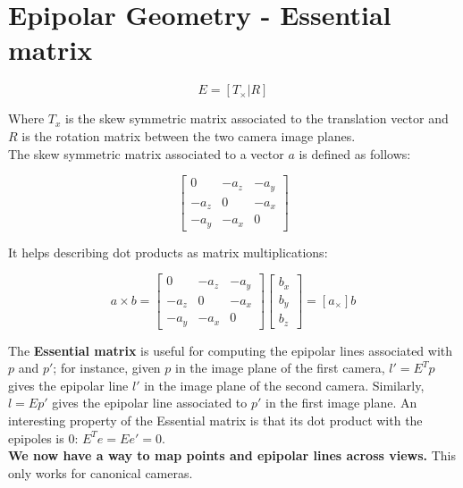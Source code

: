 \documentclass{article}
\begin{document}
\section*{Epipolar Geometry - Essential matrix}

\begin{equation*}
    E = [T_{\times} | R]
\end{equation*}

Where $T_x$ is the skew symmetric matrix associated to the translation vector and $R$ is the rotation matrix between the two camera image planes. \\

The skew symmetric matrix associated to a vector $a$ is defined as follows:

\begin{equation*}
    \begin{bmatrix}
        0 & -a_z & -a_y \\
        -a_z & 0 & -a_x \\
        -a_y & -a_x & 0
    \end{bmatrix}
\end{equation*}

It helps describing dot products as matrix multiplications:

\begin{equation*}
    a \times b = 
    \begin{bmatrix}
        0 & -a_z & -a_y \\
        -a_z & 0 & -a_x \\
        -a_y & -a_x & 0
    \end{bmatrix}
    \begin{bmatrix}
        b_x \\
        b_y \\
        b_z 
    \end{bmatrix} 
    = [a_{\times}] b
\end{equation*}

The \textbf{Essential matrix} is useful for computing the epipolar lines associated with $p$ and $p'$; for instance, given $p$ in the image plane of the first camera, $l' = E^Tp$ gives the epipolar line $l'$ in the image plane of the second camera. Similarly, $l = Ep'$ gives the epipolar line associated to $p'$ in the first image plane. An interesting property of the Essential matrix is that its dot product with the epipoles is $0$: $E^T e = E e' = 0$.\\

\textbf{We now have a way to map points and epipolar lines across views.} This only works for canonical cameras.
\end{document}
